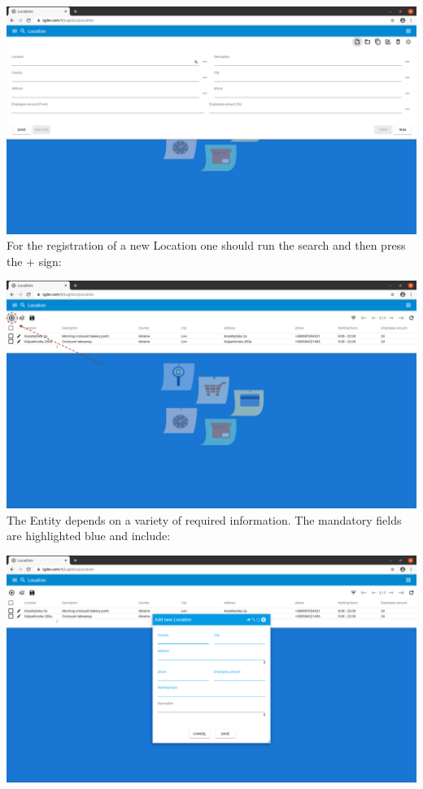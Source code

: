 \includegraphics[width=\textwidth]{sections/01-chapter/images/location11.png}\\

For the registration of a new Location one should run the search and then press the + sign:

\includegraphics[width=\textwidth]{sections/01-chapter/images/location12.png}\\

The Entity depends on a variety of required information. The mandatory fields are highlighted blue and include:

\includegraphics[width=\textwidth]{sections/01-chapter/images/location13.png}\\

